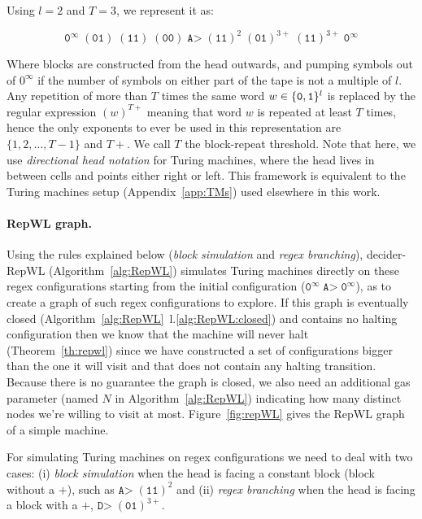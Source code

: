 Using $l=2$ and $T = 3$, we represent it as:

$$ \texttt{0}^\infty \; (\texttt{01}) \; (\texttt{11}) \; (\texttt{00}) \; \texttt{A>} \; (\texttt{11})^2 \; (\texttt{01})^{3+} \; (\texttt{11})^{3+} \; \texttt{0}^\infty $$

Where blocks are constructed from the head outwards, and pumping symbols \szero out of $0^\infty$ if the number of symbols on either part of the tape is not a multiple of $l$. Any repetition of more than $T$ times the same word $w \in \{\texttt{0},\texttt{1}\}^l$ is replaced by the regular expression $(w)^{T+}$ meaning that word $w$ is repeated at least $T$ times, hence the only exponents to ever be used in this representation are $\{1,2,\dots,T-1\}$ and $T+$. We call $T$ the block-repeat threshold. Note that here, we use \textit{directional head notation} for Turing machines, where the head lives in between cells and points either right or left. This framework is equivalent to the Turing machines setup (Appendix~\ref{app:TMs}) used elsewhere in this work.

\paragraph{RepWL graph.} Using the rules explained below (\textit{block simulation} and \textit{regex branching}), {\sc decider-RepWL} (Algorithm~\ref{alg:RepWL}) simulates Turing machines directly on these regex configurations starting from the initial configuration (\ie $\texttt{0}^\infty \; \texttt{A>} \; \texttt{0}^\infty$), as to create a graph of such regex configurations to explore. If this graph is eventually closed (Algorithm~\ref{alg:RepWL}~l.\ref{alg:RepWL:closed}) and contains no halting configuration then we know that the machine will never halt (Theorem~\ref{th:repwl}) since we have constructed a set of configurations bigger than the one it will visit and that does not contain any halting transition. Because there is no guarantee the graph is closed, we also need an additional gas parameter (named $N$ in Algorithm~\ref{alg:RepWL}) indicating how many distinct nodes we're willing to visit at most. Figure~\ref{fig:repWL} gives the RepWL graph of a simple machine.

For simulating Turing machines on regex configurations we need to deal with two cases: (i) \textit{block simulation} when the head is facing a constant block (\ie block without a $+$), such as $\texttt{A>} \; (\texttt{11})^2$ and (ii) \textit{regex branching} when the head is facing a block with a $+$, \eg $\texttt{D>} \; (\texttt{01})^{3+}$.

